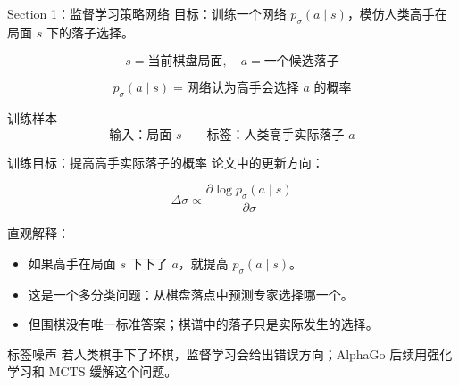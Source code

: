 \documentclass[UTF8,aspectratio=169,10pt]{ctexbeamer}
\newcommand{\slpolicy}{$p_{\sigma}(a\mid s)$}
\begin{document}
\begin{frame}{Section 1：监督学习策略网络}
  目标：训练一个网络 \slpolicy，模仿人类高手在局面 $s$ 下的落子选择。

  \[
    s = \text{当前棋盘局面}, \quad
    a = \text{一个候选落子}
  \]

  \[
    p_{\sigma}(a\mid s) = \text{网络认为高手会选择 } a \text{ 的概率}
  \]

  \begin{block}{训练样本}
    \[
      \text{输入：局面 } s
      \qquad
      \text{标签：人类高手实际落子 } a
    \]
  \end{block}
\end{frame}

\begin{frame}{训练目标：提高高手实际落子的概率}
  论文中的更新方向：

  \[
    \Delta \sigma \propto
    \frac{\partial \log p_{\sigma}(a\mid s)}{\partial \sigma}
  \]

  直观解释：

  \begin{itemize}
    \item 如果高手在局面 $s$ 下下了 $a$，就提高 $p_{\sigma}(a\mid s)$。
    \item 这是一个多分类问题：从棋盘落点中预测专家选择哪一个。
    \item 但围棋没有唯一标准答案；棋谱中的落子只是实际发生的选择。
  \end{itemize}

  \begin{alertblock}{标签噪声}
    若人类棋手下了坏棋，监督学习会给出错误方向；AlphaGo 后续用强化学习和 MCTS 缓解这个问题。
  \end{alertblock}
\end{frame}
\end{document}
